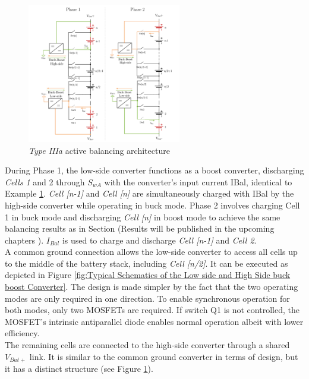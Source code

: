 \begin{figure}[h]
	\centering
	\includegraphics[width=0.6\textwidth]{Chap04/Figures/Type3a_ABMS.PNG}
	\caption{\textit{Type IIIa}  active balancing architecture}
	\label{fig:Type3a active balancing architecture}
\end{figure}
During Phase 1, the low-side converter functions as a boost converter, discharging \textit{Cells 1} and 2 through $S_{wA}$ with the converter's input current IBal, identical to Example \ref{fig:Type3a active balancing architecture}. \textit{Cell [n-1]} and \textit{Cell [n]} are simultaneously charged with IBal by the high-side converter while operating in buck mode. Phase 2 involves charging Cell 1 in buck mode and discharging \textit{Cell [n]} in boost mode to achieve the same balancing results as in Section (Results will be published in the upcoming chapters ). $I_{Bal}$ is used to charge and discharge \textit{Cell [n-1]} and \textit{Cell 2}.\\
A common ground connection allows the low-side converter to access all cells up to the middle of the battery stack, including \textit{Cell [n/2]}. It can be executed as depicted in Figure \ref{fig:Typical Schematics of the Low side and High Side buck boost Converter}. The design is made simpler by the fact that the two operating modes are only required in one direction. To enable synchronous operation for both modes, only two MOSFETs are required. If switch Q1 is not controlled, the MOSFET's intrinsic antiparallel diode enables normal operation albeit with lower efficiency.\\
The remaining cells are connected to the high-side converter through a shared $V_{Bat+}$ link. It is similar to the common ground converter in terms of design, but it has a distinct structure (see Figure \ref{fig:Type3a active balancing architecture}).